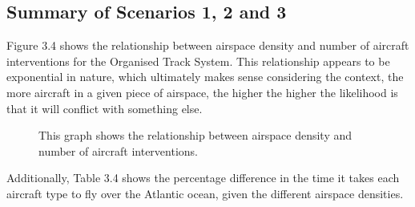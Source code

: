 \documentclass[stu, a4paper, 12pt, floatsintext]{apa7}
\numberwithin{figure}{section}
\numberwithin{table}{section}
\numberwithin{equation}{section}
\begin{document}
\subsection{Summary of Scenarios 1, 2 and 3}
Figure 3.4 shows the relationship between airspace density and number of aircraft interventions for the Organised Track System. This relationship appears to be exponential in nature, which ultimately makes sense considering the context, the more aircraft in a given piece of airspace, the higher the higher the likelihood is that it will conflict with something else. 
\begin{figure}[H]
    \caption{This graph shows the relationship between airspace density and number of aircraft interventions.}
    \label{fig:3.4}
    \centering
\end{figure}
Additionally, Table 3.4 shows the percentage difference in the time it takes each aircraft type to fly over the Atlantic ocean, given the different airspace densities.
\end{document}
